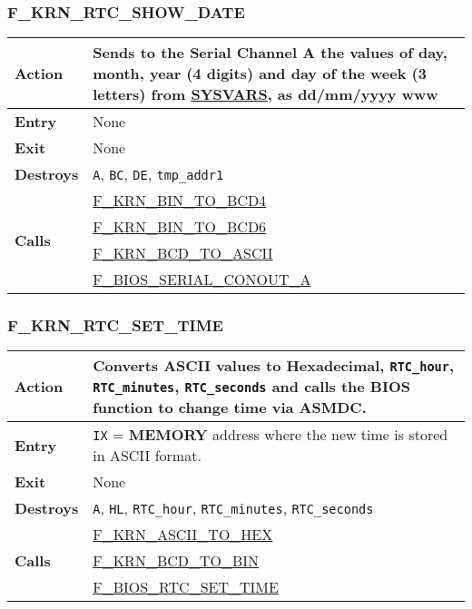     \subsubsection{F\_KRN\_RTC\_SHOW\_DATE}
    \label{func:fkrnrtcshowdate}
    \begin{tabular}{l p{9cm}}
        \hline\textbf{Action}
        & Sends to the \textbf{Serial Channel A} the values of day, month,
        year (4 digits) and day of the week (3 letters) from
        \hyperref[sec:ram_memmap]{SYSVARS}, as dd/mm/yyyy www\\
        \hline\textbf{Entry} & None \\
        \hline\textbf{Exit} & None \\
        \hline\textbf{Destroys} & \texttt{A}, \texttt{BC}, \texttt{DE},
        \texttt{tmp\_addr1}\\
        \hline\multirow[t]{4}{4em}{\textbf{Calls}}
        & \hyperref[func:fkrnbintobcd4]{F\_KRN\_BIN\_TO\_BCD4}\\
        & \hyperref[func:fkrnbintobcd6]{F\_KRN\_BIN\_TO\_BCD6}\\
        & \hyperref[func:fkrnbcdtoascii]{F\_KRN\_BCD\_TO\_ASCII}\\
        & \hyperref[func:fbiosserialconouta]{F\_BIOS\_SERIAL\_CONOUT\_A}\\
        \hline
    \end{tabular}

    \subsubsection{F\_KRN\_RTC\_SET\_TIME}
    \label{func:fkrnrtcsettime}
    \begin{tabular}{l p{9cm}}
        \hline\textbf{Action}
        & Converts ASCII values to Hexadecimal, \texttt{RTC\_hour},
        \texttt{RTC\_minutes}, \texttt{RTC\_seconds} and calls the BIOS
        function to change time via \textbf{ASMDC}.\\
        \hline\textbf{Entry} & \texttt{IX} = \textbf{MEMORY} address where
        the new time is stored in ASCII format.\\
        \hline\textbf{Exit} & None \\
        \hline\textbf{Destroys} & \texttt{A}, \texttt{HL}, \texttt{RTC\_hour},
        \texttt{RTC\_minutes}, \texttt{RTC\_seconds}\\
        \hline\multirow[t]{3}{4em}{\textbf{Calls}}
        & \hyperref[func:fkrnasciitohex]{F\_KRN\_ASCII\_TO\_HEX}\\
        & \hyperref[func:fkrnbcdtobin]{F\_KRN\_BCD\_TO\_BIN}\\
        & \hyperref[func:fbiosrtcsettime]{F\_BIOS\_RTC\_SET\_TIME}\\
        \hline
    \end{tabular}

